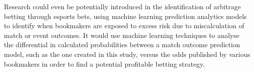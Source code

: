 Research could even be potentially introduced in the identification of arbitrage betting through esports bets, using machine learning prediction analytics models to identify when bookmakers are exposed to excess risk due to miscalculation of match or event outcomes.
It would use machine learning techniques to analyse the differential in calculated probabilities between a match outcome prediction model, such as the one created in this study, versus the odds published by various bookmakers in order to find a potential profitable betting strategy.